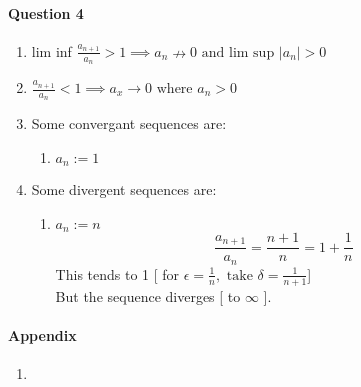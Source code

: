 \documentclass[20pt]{extarticle} %
\begin{document}
\paragraph{Question 4}
\begin{enumerate}[label=\Roman*]
	\item lim inf $ \frac{a_{n+1}}{a_n}>1 \implies a_n \nrightarrow 0 \text{ and }  \text{lim sup } |a_n|>0   $
	\item {}$ \frac{a_{n+1}}{a_n}<1 \implies a_x \rightarrow 0 \text{ where } a_n>0$
	\item Some convergant sequences are:
		\begin{enumerate}
			\item	$a_n:=1$
		\end{enumerate}
	\item Some divergent sequences are: \begin{enumerate}
		\item	$a_n := n$
			\[\frac{  a_{n+1} }{  a_n  }= \frac{n+1}{n}=1+ \frac{1}{n} \]
			This tends to 1 [ for $ \epsilon= \frac{1}{n} , \text{ take } \delta = \frac{1}{n+1}   $]\\
			But the sequence diverges [ to $\infty$  ].
	\end{enumerate}
\end{enumerate}

\paragraph{Appendix}
\begin{enumerate}
	\item {}
\end{enumerate}
\end{document}
